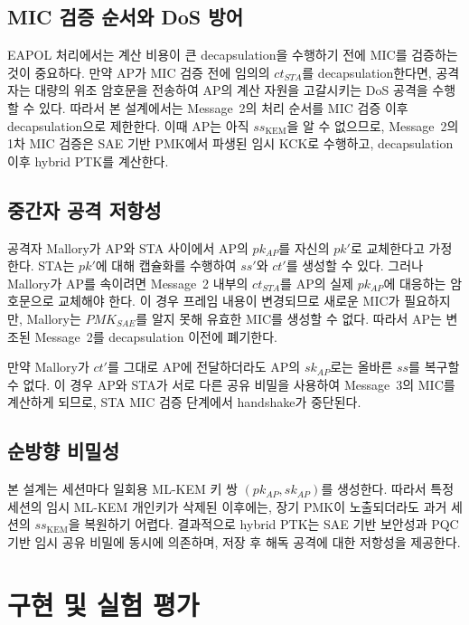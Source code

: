 \documentclass[11pt]{article}
\newcommand{\pkAP}{\ensuremath{pk_{AP}}}
\newcommand{\skAP}{\ensuremath{sk_{AP}}}
\newcommand{\ctSTA}{\ensuremath{ct_{STA}}}
\newcommand{\ssK}{\ensuremath{ss_{\mathrm{KEM}}}}
\newcommand{\pmkSAE}{\ensuremath{PMK_{SAE}}}
\theoremstyle{definition}
\theoremstyle{plain}
\begin{document}
\subsection{MIC 검증 순서와 DoS 방어}\label{sec:dos}
EAPOL 처리에서는 계산 비용이 큰 decapsulation을 수행하기 전에 MIC를 검증하는 것이
중요하다. 만약 AP가 MIC 검증 전에 임의의 \ctSTA{}를 decapsulation한다면,
공격자는 대량의 위조 암호문을 전송하여 AP의 계산 자원을 고갈시키는 DoS
공격을 수행할 수 있다. 따라서 본 설계에서는 Message~2의 처리 순서를 MIC 검증
이후 decapsulation으로 제한한다. 이때 AP는 아직 \ssK{}을 알 수 없으므로,
Message~2의 1차 MIC 검증은 SAE 기반 PMK에서 파생된 임시 KCK로 수행하고,
decapsulation 이후 hybrid PTK를 계산한다.

\subsection{중간자 공격 저항성}\label{sec:mitm}
공격자 Mallory가 AP와 STA 사이에서 AP의 \pkAP{}를 자신의 $pk'$로 교체한다고
가정한다. STA는 $pk'$에 대해 캡슐화를 수행하여 $ss'$와 $ct'$를 생성할 수
있다. 그러나 Mallory가 AP를 속이려면 Message~2 내부의 \ctSTA{}를 AP의 실제
\pkAP{}에 대응하는 암호문으로 교체해야 한다. 이 경우 프레임 내용이 변경되므로
새로운 MIC가 필요하지만, Mallory는 \pmkSAE{}를 알지 못해 유효한 MIC를 생성할 수
없다. 따라서 AP는 변조된 Message~2를 decapsulation 이전에 폐기한다.

만약 Mallory가 $ct'$를 그대로 AP에 전달하더라도 AP의 \skAP{}로는 올바른
$ss$를 복구할 수 없다. 이 경우 AP와 STA가 서로 다른 공유 비밀을 사용하여
Message~3의 MIC를 계산하게 되므로, STA MIC 검증 단계에서 handshake가
중단된다.

\subsection{순방향 비밀성}\label{sec:fs}
본 설계는 세션마다 일회용 ML-KEM 키 쌍 $(\pkAP,\skAP)$를 생성한다. 따라서
특정 세션의 임시 ML-KEM 개인키가 삭제된 이후에는, 장기 PMK이 노출되더라도
과거 세션의 \ssK{}을 복원하기 어렵다. 결과적으로 hybrid PTK는 SAE 기반
보안성과 PQC 기반 임시 공유 비밀에 동시에 의존하며, 저장 후 해독 공격에 대한
저항성을 제공한다.

\section{구현 및 실험 평가}\label{sec:impl}
\end{document}
